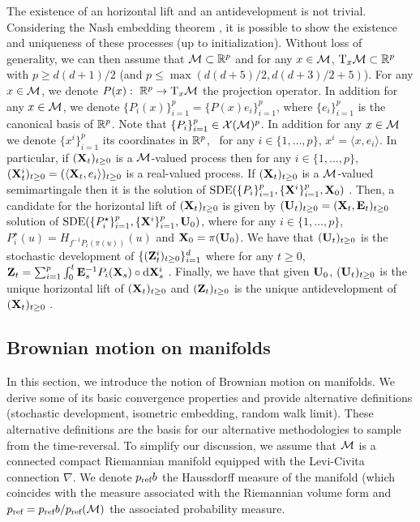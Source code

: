 The existence of an horizontal lift and an antidevelopment is not
trivial. Considering the Nash embedding theorem 
\citep[see for example][]{gunther1991isometric}, it is possible to show the existence
and uniqueness of these processes (up to initialization). Without loss of
generality, we can then assume that $\mathcal M \subset \mathbb{R}^p$ and for any $x \in \mathcal M$,
$\mathrm{T}_x \mathcal M \subset \mathbb{R}^p$ with $p \geq d(d+1)/2$ (and
$p \leq \max(d(d+5)/2, d(d+3)/2+5)$). For any $x \in \mathcal M$, we denote
$P(x): \ \mathbb{R}^p \to \mathrm{T}_x \mathcal M$ the projection operator. In addition for
any $x \in \mathcal M$, we denote $\{P_i(x)\}_{i=1}^p = \{P(x) e_i\}_{i=1}^p$, where
$\{e_i\}_{i=1}^p$ is the canonical basis of $\mathbb{R}^p$. Note that
$\{P_i\}_{i=1}^p \in \mathcal{X}(\mathcal{M})^p$. In addition for any $x \in \mathcal M$ we denote
$\{x^i\}_{i=1}^p$ its coordinates in $\mathbb{R}^p$, \ie \ for any
$i \in \{1, \dots, p\}$, $x^i = \langle x, e_i \rangle$. In particular, if
$(\mathbf{X}_t)_{t \geq 0}$ is a $\mathcal M$-valued process then for any
$i \in \{1, \dots, p\}$,
$(\mathbf{X}_t^i)_{t \geq 0} = (\langle \mathbf{X}_t, e_i \rangle)_{t \geq 0}$ is a
real-valued process. If $(\mathbf{X}_t)_{t \geq 0}$ is a $\mathcal M$-valued semimartingale
then it is the solution of $\mathrm{SDE}(\{P_i\}_{i=1}^p, \{\mathbf{X}^i\}_{i=1}^p, \mathbf{X}_0)$
\cite[see][Lemma 2.3.3]{hsu2002stochastic}. Then, a candidate for the horizontal
lift of $(\mathbf{X}_t)_{t \geq 0}$ is given by
$(\mathbf{U}_t)_{t \geq 0}=(\mathbf{X}_t, \mathbf{E}_t)_{t \geq 0}$ solution of
$\mathrm{SDE}(\{P_i^\star\}_{i=1}^p, \{\mathbf{X}^i\}_{i=1}^p, \mathbf{U}_0)$, where for any
$i \in \{1,\dots,p\}$, $P_i^\star(u) = H_{f^{-1}P_i(\pi(u))}(u)$ and
$\mathbf{X}_0 = \pi(\mathbf{U}_0)$. We have that $(\mathbf{U}_t)_{t \geq 0}$ is the stochastic
development of $\{(\mathbf{Z}_t^i)_{t \geq 0}\}_{i=1}^d$ where for any $t \geq 0$,
$\mathbf{Z}_t = \sum_{i=1}^p \int_0^t \mathbf{E}_s^{-1} P_i(\mathbf{X}_s) \circ \mathrm{d} \mathbf{X}_s^i$
 \cite[see][Theorem 2.3.4]{hsu2002stochastic}. Finally, we have that given
$\mathbf{U}_0$, $(\mathbf{U}_t)_{t \geq 0}$ is the unique horizontal lift of
$(\mathbf{X}_t)_{t \geq 0}$ and $(\mathbf{Z}_t)_{t \geq 0}$ is the unique antidevelopment of
$(\mathbf{X}_t)_{t \geq 0}$ \cite[see][Theorem 2.3.5]{hsu2002stochastic}.

\subsection{Brownian motion on manifolds}
\label{sec:brown-moti-manif}

In this section, we introduce the notion of Brownian motion on manifolds. We
derive some of its basic convergence properties and provide alternative
definitions (stochastic development, isometric embedding, random walk
limit). These alternative definitions are the basis for our alternative
methodologies to sample from the time-reversal. To simplify our discussion, we
assume that $\mathcal M$ is a connected compact Riemannian manifold equipped with the
Levi-Civita connection $\nabla$. We denote $p_{\textup{ref}}b$ the Haussdorff measure of
the manifold (which coincides with the measure associated with the Riemannian
volume form \citep[see][Theorem 2.10.10]{federer2014geometric} and
$p_{\textup{ref}} = p_{\textup{ref}}b / p_{\textup{ref}}(\mathcal M)$ the associated probability measure.

